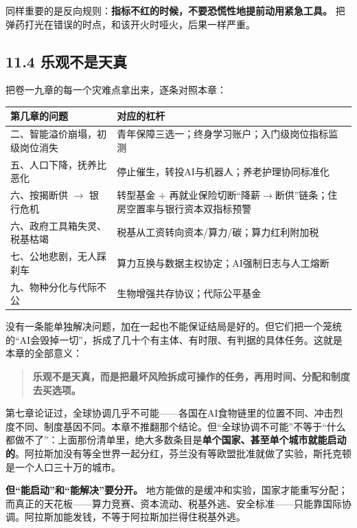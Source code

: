 \documentclass[11pt,a4paper]{ctexart}
\begin{document}
同样重要的是反向规则：\textbf{指标不红的时候，不要恐慌性地提前动用紧急工具。} 把弹药打光在错误的时点，和该开火时哑火，后果一样严重。

\subsection{11.4 乐观不是天真}

把卷一九章的每一个灾难点拿出来，逐条对照本章：

\begin{center}

\begin{tabularx}{\textwidth}{lX}
\toprule
第几章的问题 & 对应的杠杆 \\
\midrule
二、智能溢价崩塌，初级岗位消失 & 青年保障三选一；终身学习账户；入门级岗位指标监测 \\
五、人口下降，抚养比恶化 & 停止催生，转投AI与机器人；养老护理协同标准化 \\
六、按揭断供 $\to$ 银行危机 & 转型基金 + 再就业保险切断“降薪$\to$断供”链条；住房空置率与银行资本双指标预警 \\
六、政府工具箱失灵、税基枯竭 & 税基从工资转向资本/算力/碳；算力红利附加税 \\
七、公地悲剧，无人踩刹车 & 算力互换与数据主权协定；AI强制日志与人工熔断 \\
九、物种分化与代际不公 & 生物增强共存协议；代际公平基金 \\
\bottomrule
\end{tabularx}
\end{center}

没有一条能单独解决问题，加在一起也不能保证结局是好的。但它们把一个笼统的“AI会毁掉一切”，拆成了几十个有主体、有时限、有判据的具体任务。这就是本章的全部意义：

\begin{quote}
\textbf{乐观不是天真，而是把最坏风险拆成可操作的任务，再用时间、分配和制度去买选项。}
\end{quote}

第七章论证过，全球协调几乎不可能——各国在AI食物链里的位置不同、冲击烈度不同、制度基因不同。本章不推翻那个结论。但“全球协调不可能”不等于“什么都做不了”：上面那份清单里，绝大多数条目是\textbf{单个国家、甚至单个城市就能启动的}。阿拉斯加没有等全世界一起分红，芬兰没有等欧盟批准就做了实验，斯托克顿是一个人口三十万的城市。

\textbf{但“能启动”和“能解决”要分开。} 地方能做的是缓冲和实验，国家才能重写分配；而真正的天花板——算力竞赛、资本流动、税基外逃、安全标准——只能靠国际协调。阿拉斯加能发钱，不等于阿拉斯加拦得住税基外逃。
\end{document}
